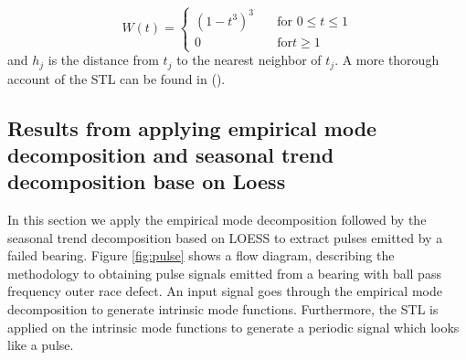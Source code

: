 \documentclass[../Main/thesis.tex]{subfiles}
\begin{document}
\begin{equation}
W(t) = 
  \begin{cases}
  \left(1-t^{3}\right)^{3} &\quad\text{for } 0\leq t \le 1\\
   0 &\quad\text{for} t\geq 1
 \end{cases}
\end{equation}
and $h_{j}$ is the distance from $t_{j}$ to the nearest neighbor of $t_{j}$. A more thorough account of the STL can be found in  (\cite{Cleveland-et-al-1990}).





\subsection{Results from applying empirical mode decomposition and seasonal trend decomposition base on Loess}
In this section we apply the empirical mode decomposition followed by the seasonal trend decomposition based on LOESS to extract pulses emitted by a failed bearing.
Figure \ref{fig:pulse} shows a flow diagram, describing the methodology to obtaining pulse signals emitted from a bearing with ball pass frequency outer race defect. An input signal goes through the empirical mode decomposition to generate intrinsic mode functions. Furthermore, the STL is applied on the intrinsic mode functions to generate a periodic signal which looks like a pulse.
\end{document}
